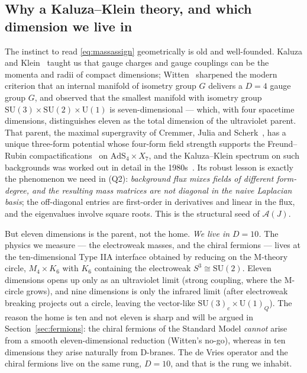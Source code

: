 \documentclass[11pt]{article}
\theoremstyle{plain}
\theoremstyle{definition}
\newcommand{\cA}{\mathcal{A}}
\newcommand{\SU}{\mathrm{SU}}
\newcommand{\U}{\mathrm{U}}
\newcommand{\AdS}{\mathrm{AdS}}
\begin{document}
\subsection{Why a Kaluza--Klein theory, and which dimension we live in}

The instinct to read \eqref{eq:massassign} geometrically is old and
well-founded. Kaluza and Klein~\cite{Kaluza1921,Klein1926} taught us that
gauge charges and gauge couplings can be the momenta and radii of compact
dimensions; Witten~\cite{Witten1981} sharpened the modern criterion that an
internal manifold of isometry group $G$ delivers a $D=4$ gauge group $G$, and
observed that the smallest manifold with isometry group
$\SU(3)\times\SU(2)\times\U(1)$ is seven-dimensional --- which, with four
spacetime dimensions, distinguishes eleven as the total dimension of the
ultraviolet parent. That parent, the maximal supergravity of Cremmer, Julia
and Scherk~\cite{CremmerJuliaScherk1978}, has a unique three-form potential
whose four-form field strength supports the Freund--Rubin
compactifications~\cite{FreundRubin1980} on $\AdS_4\times X_7$, and the
Kaluza--Klein spectrum on such backgrounds was worked out in detail in the
1980s~\cite{DuffNilssonPope1986,CasherEnglertNicolaiRooman1984,Englert1982}.
Its robust lesson is exactly the phenomenon we need in (Q2):
\emph{background flux mixes fields of different form-degree, and the resulting
mass matrices are not diagonal in the naive Laplacian basis}; the off-diagonal
entries are first-order in derivatives and linear in the flux, and the
eigenvalues involve square roots. This is the structural seed of $\cA(J)$.

But eleven dimensions is the parent, not the home. \emph{We live in $D=10$.}
The physics we measure --- the electroweak masses, and the chiral fermions
--- lives at the ten-dimensional Type IIA interface obtained by reducing on
the M-theory circle, $M_4\times K_6$ with $K_6$ containing the electroweak
$S^3\cong\SU(2)$. Eleven dimensions opens up only as an ultraviolet limit
(strong coupling, where the M-circle grows), and nine dimensions is only the
infrared limit (after electroweak breaking projects out a circle, leaving the
vector-like $\SU(3)_c\times\U(1)_Q$). The reason the home is ten and not
eleven is sharp and will be argued in Section~\ref{sec:fermions}: the chiral
fermions of the Standard Model \emph{cannot} arise from a smooth
eleven-dimensional reduction (Witten's no-go), whereas in ten dimensions they
arise naturally from D-branes. The de Vries operator and the chiral fermions
live on the same rung, $D=10$, and that is the rung we inhabit.
\end{document}
